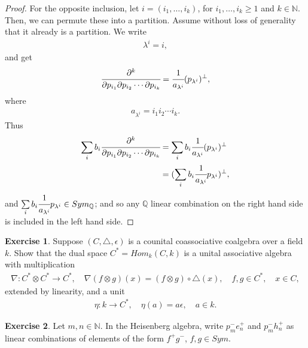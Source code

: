\documentclass[8pt]{extarticle}
\newcommand{\N}{\mathbb{N}}
\newcommand{\Q}{\mathbb{Q}}
\newcommand{\<}{\langle}
\renewcommand{\>}{\rangle}
\theoremstyle{definition}
\newtheorem{exercise}{Exercise}
\begin{document}
\begin{proof}
  For the opposite inclusion, let $i = (i_1, \dots, i_k)$, for $i_1, \dots, i_k \geq 1$ and $k \in \N$. Then, we can permute these into a partition. Assume without loss of generality that it already is a partition. We write
  \begin{align*}
    \lambda^i = i,
  \end{align*}
  and get
  \begin{align*}
    \cfrac{\partial^k}{\partial p_{i_1} \partial p_{i_2} \cdots \partial p_{i_k}} = \cfrac{1}{a_{\lambda^i}} (p_{\lambda^i})^{\perp},
  \end{align*}
  where
  \begin{align*}
    a_{\lambda^i} = i_1 i_2 \cdots i_k.
  \end{align*}
  Thus
  \begin{align*}
    \sum\limits_{i} b_{i}\cfrac{\partial^k}{\partial p_{i_1} \partial p_{i_2} \cdots \partial p_{i_k}}
    &=
    \sum\limits_{i} b_{i}\cfrac{1}{a_{\lambda^i}} (p_{\lambda^i})^{\perp} \\
    &=
    (\sum\limits_{i} b_{i}\cfrac{1}{a_{\lambda^i}}p_{\lambda^i})^{\perp},
  \end{align*}
  and $\sum\limits_{i} b_{i}\cfrac{1}{a_{\lambda^i}}p_{\lambda^i} \in Sym_{\Q}$; and so any $\Q$ linear combination on the right hand side is included in the left hand side.
\end{proof}
\newpage
\begin{exercise}
  Suppose $(C, \triangle, \epsilon)$ is a counital coassociative coalgebra over a field $k$. Show that the dual space $C^* = Hom_k(C,k)$ is a unital associative algebra with multiplication
  \begin{align*}
    \nabla: C^* \otimes C^* \to C^*, \quad \nabla(f \otimes g)(x) = (f \otimes g) \circ \triangle(x), \quad f, g \in C^*, \quad x \in C,
  \end{align*}
  extended by linearity, and a unit
  \begin{align*}
    \eta: k \to C^* , \quad \eta(a) = a\epsilon, \quad a \in k.
  \end{align*}
\end{exercise}

\begin{exercise}
  Let $m,n \in \N$. In the Heisenberg algebra, write $p_m^-e_n^+$ and $p_m^-h_n^+$ as linear combinations of elements of the form $f^+g^-$, $f,g \in Sym$.
\end{exercise}
\end{document}
